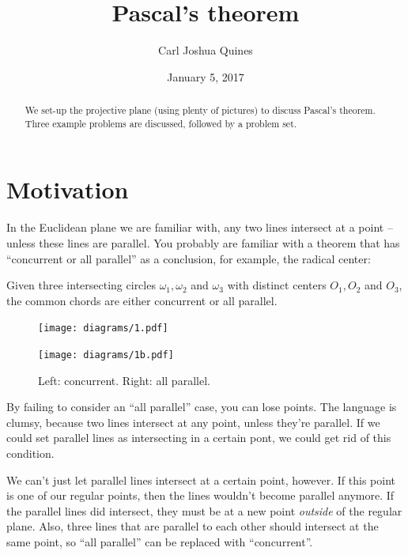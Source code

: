 \documentclass[11pt,paper=letter]{scrartcl}
\begin{document}
\title{Pascal's theorem}

\author{Carl Joshua Quines}

\date{January 5, 2017}

\maketitle

\begin{abstract}
We set-up the projective plane (using plenty of pictures) to discuss Pascal's theorem. Three example problems are discussed, followed by a problem set.
\end{abstract}

\section{Motivation}

In the Euclidean plane we are familiar with, any two lines intersect at a point -- unless these lines are parallel. You probably are familiar with a theorem that has ``concurrent or all parallel'' as a conclusion, for example, the radical center:

\begin{theorem*}
Given three intersecting circles $\omega_1, \omega_2$ and $\omega_3$ with distinct centers $O_1, O_2$ and $O_3$, the common chords are either concurrent or all parallel.
\end{theorem*}

\begin{figure}
  \centering
    \begin{minipage}{0.4\textwidth}
    \centering
    \texttt{[image: diagrams/1.pdf]}
    \end{minipage}
    \begin{minipage}{0.4\textwidth}
    \centering
    \texttt{[image: diagrams/1b.pdf]}
    \end{minipage}
  \caption{Left: concurrent. Right: all parallel.}
\end{figure}

By failing to consider an ``all parallel'' case, you can lose points. The language is clumsy, because two lines intersect at any point, unless they're parallel. If we could set parallel lines as intersecting in a certain pont, we could get rid of this condition.

We can't just let parallel lines intersect at a certain point, however. If this point is one of our regular points, then the lines wouldn't become parallel anymore. If the parallel lines did intersect, they must be at a new point \emph{outside} of the regular plane. Also, three lines that are parallel to each other should intersect at the same point, so ``all parallel'' can be replaced with ``concurrent''.
\end{document}
